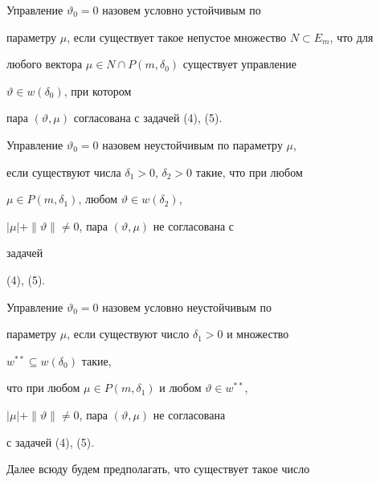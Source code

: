  


\begin{defn} 


Управление $\vartheta_0=0$ назовем условно устойчивым по 


параметру $\mu$, если существует такое непустое множество $N\subset 


E_m$, что для 


любого вектора $\mu\in N\cap P(m,\delta_0)$ существует управление 


$\vartheta\in w(\delta_0)$, при котором 


пара $(\vartheta,\mu)$ согласована с задачей (4), (5). 


\end{defn} 


 


\begin{defn} 


Управление $\vartheta_0=0$ назовем неустойчивым по параметру $\mu$, 


если существуют числа $\delta_1>0$, $\delta_2>0$ такие, что при любом 


$\mu\in P(m,\delta_1)$, любом $\vartheta\in w(\delta_2)$, 


$|\mu|+\|\vartheta\|\ne0$, пара $(\vartheta,\mu)$ не согласована с 


задачей 


(4), (5). 


\end{defn} 


 


\begin{defn} 


Управление $\vartheta_0=0$ назовем условно неустойчивым по 


параметру $\mu$, если существуют число $\delta_1>0$ и множество 


$w^{**}\subseteq w(\delta_0)$ такие, 


что при любом $\mu\in P(m,\delta_1)$ и любом $\vartheta\in w^{**}$, 


$|\mu|+\|\vartheta\|\ne0$, пара $(\vartheta,\mu)$ не согласована 


с задачей (4), (5). 


\end{defn} 


 


Далее всюду будем предполагать, что существует такое число 


